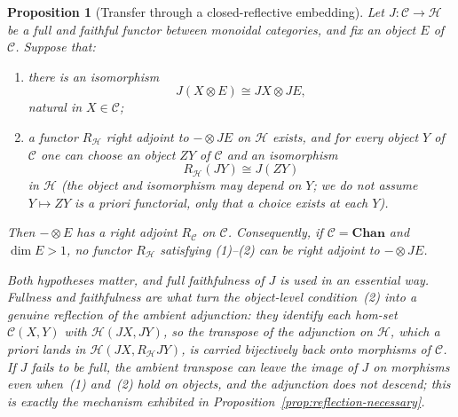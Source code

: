 \documentclass[11pt]{article}
\newtheorem{proposition}[theorem]{Proposition}
\begin{document}
\begin{proposition}[Transfer through a closed-reflective embedding]
\label{prop:comb-transfer}
Let $J:\mathcal C\to\mathcal H$ be a \emph{full and faithful} functor between
monoidal categories, and fix an object $E$ of $\mathcal C$. Suppose that:
\begin{enumerate}
\item there is an isomorphism
\[
J(X\otimes E)\cong JX\otimes JE,
\]
natural in $X\in\mathcal C$;
\item a functor $R_{\mathcal H}$ right adjoint to $-\otimes JE$ on
$\mathcal H$ exists, and for every object $Y$ of $\mathcal C$ one can
choose an object $ZY$ of $\mathcal C$ and an isomorphism
\[
R_{\mathcal H}(JY)\cong J(ZY)
\]
in $\mathcal H$ (the object and isomorphism may depend on $Y$; we do not
assume $Y\mapsto ZY$ is a priori functorial, only that a choice exists at
each $Y$).
\end{enumerate}
Then $-\otimes E$ has a right adjoint $R_{\mathcal C}$ on $\mathcal C$.
Consequently, if $\mathcal C=\mathbf{Chan}$ and $\dim E>1$, no functor
$R_{\mathcal H}$ satisfying (1)--(2) can be right adjoint to
$-\otimes JE$.

Both hypotheses matter, and full faithfulness of $J$ is used in an essential
way. Fullness and faithfulness are what turn the object-level condition~(2)
into a genuine reflection of the ambient adjunction: they identify each
hom-set $\mathcal C(X,Y)$ with $\mathcal H(JX,JY)$, so the transpose of the
adjunction on $\mathcal H$, which a priori lands in $\mathcal H(JX,R_{\mathcal
H}JY)$, is carried \emph{bijectively} back onto morphisms of $\mathcal C$. If
$J$ fails to be full, the ambient transpose can leave the image of $J$ on
morphisms even when~(1) and~(2) hold on objects, and the adjunction does not
descend; this is exactly the mechanism exhibited in
Proposition~\ref{prop:reflection-necessary}.
\end{proposition}
\end{document}
